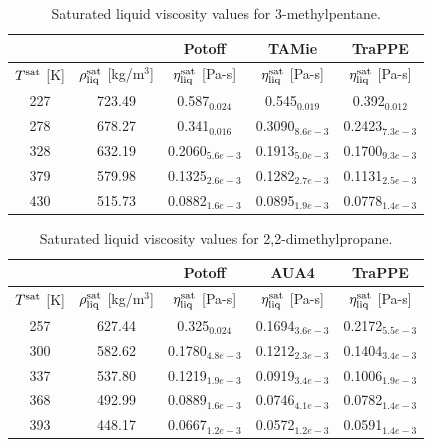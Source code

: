 \documentclass[preprint,review,12pt]{elsarticle}
\begin{document}
	\begin{table}[h!]
		\caption{Saturated liquid viscosity values for 3-methylpentane.}
		\begin{center}
			\begin{tabular}{|c|c|c|c|c|}
				\hline
				&                                       & Potoff            & TAMie             & TraPPE            \\ \hline
				$T^{\rm sat}$ {[}K{]} & $\rho^{\rm sat}_{\rm liq}$ [kg/m$^3$] & $\eta_{\rm liq}^{\rm sat}$ {[}Pa-s{]} & $\eta_{\rm liq}^{\rm sat}$ {[}Pa-s{]} & $\eta_{\rm liq}^{\rm sat}$ {[}Pa-s{]} \\ \hline
				227 & 723.49 & 0.587$_{0.024}$   & 0.545$_{0.019}$   & 0.392$_{0.012}$   \\ \hline
				278 & 678.27 & 0.341$_{0.016}$   & 0.3090$_{8.6e-3}$ & 0.2423$_{7.3e-3}$ \\ \hline
				328 & 632.19 & 0.2060$_{5.6e-3}$ & 0.1913$_{5.0e-3}$ & 0.1700$_{9.3e-3}$ \\ \hline
				379 & 579.98 & 0.1325$_{2.6e-3}$ & 0.1282$_{2.7e-3}$ & 0.1131$_{2.5e-3}$ \\ \hline
				430 & 515.73 & 0.0882$_{1.6e-3}$ & 0.0895$_{1.9e-3}$ & 0.0778$_{1.4e-3}$ \\ \hline
			\end{tabular}
		\end{center}
	\end{table}
	
	\begin{table}[h!]
		\caption{Saturated liquid viscosity values for 2,2-dimethylpropane.}
		\begin{center}
			\begin{tabular}{|c|c|c|c|c|}
				\hline
				&                                       & Potoff            & AUA4             & TraPPE            \\ \hline
				$T^{\rm sat}$ {[}K{]} & $\rho^{\rm sat}_{\rm liq}$ [kg/m$^3$] & $\eta_{\rm liq}^{\rm sat}$ {[}Pa-s{]} & $\eta_{\rm liq}^{\rm sat}$ {[}Pa-s{]} & $\eta_{\rm liq}^{\rm sat}$ {[}Pa-s{]} \\ \hline
				257 & 627.44 & 0.325$_{0.024}$   & 0.1694$_{3.6e-3}$ & 0.2172$_{5.5e-3}$ \\ \hline
				300 & 582.62 & 0.1780$_{4.8e-3}$ & 0.1212$_{2.3e-3}$ & 0.1404$_{3.4e-3}$ \\ \hline
				337 & 537.80 & 0.1219$_{1.9e-3}$ & 0.0919$_{3.4e-3}$ & 0.1006$_{1.9e-3}$ \\ \hline
				368 & 492.99 & 0.0889$_{1.6e-3}$ & 0.0746$_{4.1e-3}$ & 0.0782$_{1.4e-3}$ \\ \hline
				393 & 448.17 & 0.0667$_{1.2e-3}$ & 0.0572$_{1.2e-3}$ & 0.0591$_{1.4e-3}$ \\ \hline	
			\end{tabular}
		\end{center}
	\end{table}
	
\end{document}
